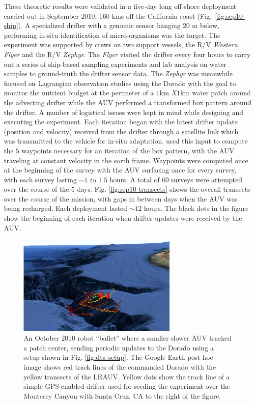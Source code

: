 These theoretic results were validated in a five-day long off-shore
deployment carried out in September 2010, 160 kms off the California
coast (Fig.~\ref{fig:sep10-ship}). A specialized drifter with a
genomic sensor \cite{scholin09} hanging $20$ m below, performing
in-situ identification of micro-organisms was the target. The
experiment was supported by crews on two support vessels, the R/V
\emph{Western Flyer} and the R/V \emph{Zephyr}. The \emph{Flyer}
visited the drifter every four hours to carry out a series of
ship-based sampling experiments and lab analysis on water samples to
ground-truth the drifter sensor data. The \emph{Zephyr} was meanwhile
focused on Lagrangian observation studies using the Dorado with the
goal to monitor the nutrient budget at the perimeter of a $1$km $X
1$km water patch around the advecting drifter while the AUV performed
a transformed box pattern around the drifter. A number of logistical
issues were kept in mind while designing and executing the
experiment. Each iteration began with the latest drifter update
(position and velocity) received from the drifter through a satellite
link which was transmitted to the vehicle for in-situ adaptation. \rx
used this input to compute the $5$ waypoints necessary for an
iteration of the box pattern, with the AUV traveling at constant
velocity in the earth frame. Waypoints were computed once at the
beginning of the survey with the AUV surfacing once for every survey,
with each survey lasting $\sim1$ to $1.5$ hours. A total of 60 surveys
were attempted over the course of the $5$
days. Fig. \ref{fig:sep10-transects} shows the overall transects over
the course of the mission, with gaps in between days when the AUV was
being recharged. Each deployment lasted $\sim12$ hours. The black dots
in the figure show the beginning of each iteration when drifter
updates were received by the AUV.


\begin{figure}[htpb]
\centering
\includegraphics[width=0.7\textwidth]{figs/oct10-ballet.pdf}
\caption{\small An October 2010 robot ``ballet'' where a smaller
  slower AUV tracked a patch center, sending periodic updates to the
  Dorado using a setup shown in Fig. \ref{fig:dta-setup}. The Google
  Earth post-hoc image shows red track lines of the \rx commanded
  Dorado with the yellow transects of the LRAUV. Yellow dots show the
  track line of a simple GPS-enabled drifter used for seeding the
  experiment over the Monterey Canyon with Santa Cruz, CA to the right
  of the figure.}
\label{fig:ballet}
\end{figure}

